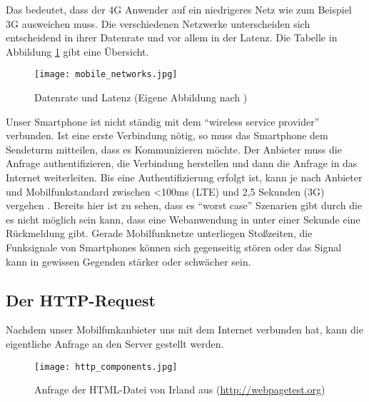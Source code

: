 			Das bedeutet, dass der 4G Anwender auf ein niedrigeres Netz wie zum Beispiel 3G ausweichen muss. Die verschiedenen Netzwerke unterscheiden sich entscheidend in ihrer Datenrate und vor allem in der Latenz. Die Tabelle in Abbildung \ref{fig:mobile_networks} gibt eine Übersicht.

			\begin{figure}[htbp]
				\begin{center}
					\texttt{[image: mobile\_networks.jpg]}
					\caption{Datenrate und Latenz (Eigene Abbildung nach \autocite{grigorikGNetwork})}
					\label{fig:mobile_networks}
				\end{center}
			\end{figure}

			Unser Smartphone ist nicht ständig mit dem "`wireless service provider"' verbunden. Ist eine erste Verbindung nötig, so muss das Smartphone dem Sendeturm mitteilen, dass es Kommunizieren möchte. Der Anbieter muss die Anfrage authentifizieren, die Verbindung herstellen und dann die Anfrage in das Internet weiterleiten. Bis eine Authentifizierung erfolgt ist, kann je nach Anbieter und Mobilfunkstandard zwischen <100ms (LTE) und 2,5 Sekunden (3G) vergehen \autocite{grigorikRadio}. Bereits hier ist zu sehen, dass es "`worst case"' Szenarien gibt durch die es nicht möglich sein kann, dass eine Webanwendung in unter einer Sekunde eine Rückmeldung gibt. Gerade Mobilfunknetze unterliegen Stoßzeiten, die Funksignale von Smartphones können sich gegenseitig stören oder das Signal kann in gewissen Gegenden stärker oder schwächer sein.



		\subsection{Der HTTP-Request} %
		\label{sub:der_http_request_komponente}
			Nachdem unser Mobilfunkanbieter uns mit dem Internet verbunden hat, kann die eigentliche Anfrage an den Server gestellt werden.

			\begin{figure}[htbp]
				\begin{center}
					\texttt{[image: http\_components.jpg]}
					\caption{Anfrage der HTML-Datei von Irland aus (\url{http://webpagetest.org})}
					\label{fig:http_components}
				\end{center}
			\end{figure}

